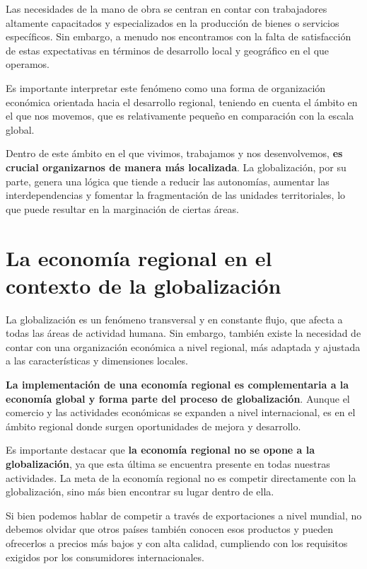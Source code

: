 \documentclass[
  jou,
  floatsintext,
  longtable,
  a4paper,
  nolmodern,
  notxfonts,
  notimes,
  12pt,
  colorlinks=true,linkcolor=blue,citecolor=blue,urlcolor=blue]{apa7}
\begin{document}
Las necesidades de la mano de obra se centran en contar con trabajadores
altamente capacitados y especializados en la producción de bienes o
servicios específicos. Sin embargo, a menudo nos encontramos con la
falta de satisfacción de estas expectativas en términos de desarrollo
local y geográfico en el que operamos.

Es importante interpretar este fenómeno como una forma de organización
económica orientada hacia el desarrollo regional, teniendo en cuenta el
ámbito en el que nos movemos, que es relativamente pequeño en
comparación con la escala global.

Dentro de este ámbito en el que vivimos, trabajamos y nos desenvolvemos,
\textbf{es crucial organizarnos de manera más localizada}. La
globalización, por su parte, genera una lógica que tiende a reducir las
autonomías, aumentar las interdependencias y fomentar la fragmentación
de las unidades territoriales, lo que puede resultar en la marginación
de ciertas áreas.

\section{La economía regional en el contexto de la
globalización}\label{la-economuxeda-regional-en-el-contexto-de-la-globalizaciuxf3n}

La globalización es un fenómeno transversal y en constante flujo, que
afecta a todas las áreas de actividad humana. Sin embargo, también
existe la necesidad de contar con una organización económica a nivel
regional, más adaptada y ajustada a las características y dimensiones
locales.

\textbf{La implementación de una economía regional es complementaria a
la economía global y forma parte del proceso de globalización}. Aunque
el comercio y las actividades económicas se expanden a nivel
internacional, es en el ámbito regional donde surgen oportunidades de
mejora y desarrollo.

Es importante destacar que \textbf{la economía regional no se opone a la
globalización}, ya que esta última se encuentra presente en todas
nuestras actividades. La meta de la economía regional no es competir
directamente con la globalización, sino más bien encontrar su lugar
dentro de ella.

Si bien podemos hablar de competir a través de exportaciones a nivel
mundial, no debemos olvidar que otros países también conocen esos
productos y pueden ofrecerlos a precios más bajos y con alta calidad,
cumpliendo con los requisitos exigidos por los consumidores
internacionales.
\end{document}
